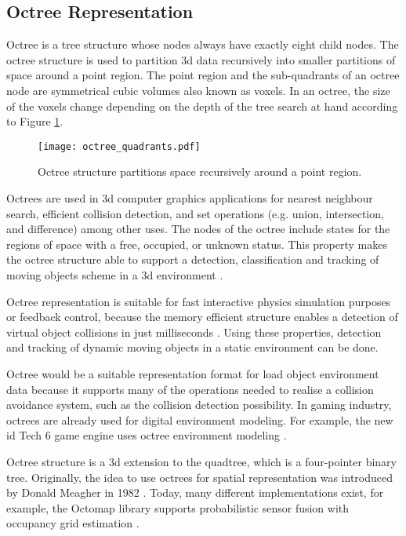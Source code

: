 \documentclass[12pt,a4paper,oneside,pdftex]{report}
\begin{document}
\subsection{Octree Representation}
\label{subsection:octree_representation}

Octree is a tree structure whose nodes always have exactly eight child nodes. The octree structure is used to partition 3d data recursively into smaller partitions of space around a point region\citep{Laine11}. The point region and the sub-quadrants of an octree node are symmetrical cubic volumes also known as voxels. In an octree, the size of the voxels change depending on the depth of the tree search at hand according to Figure \ref{fig:octree_quadrants}.

\begin{figure}[ht]
  \begin{center}
    \texttt{[image: octree\_quadrants.pdf]}
    \caption{Octree structure partitions space recursively around a point region.}
    \label{fig:octree_quadrants}
  \end{center}
\end{figure}

Octrees are used in 3d computer graphics applications for nearest neighbour search, efficient collision detection, and set operations (e.g. union, intersection, and difference) among other uses. The nodes of the octree include states for the regions of space with a free, occupied, or unknown status. This property makes the octree structure able to support a detection, classification and tracking of moving objects scheme in a 3d environment \citep{Azim12, Ouyang12}.

Octree representation is suitable for fast interactive physics simulation purposes or feedback control, because the memory efficient structure enables a detection of virtual object collisions in just milliseconds \citep{Noborio99}. Using these properties, detection and tracking of dynamic moving objects in a static environment can be done.

Octree would be a suitable representation format for load object environment data because it supports many of the operations needed to realise a collision avoidance system, such as the collision detection possibility. In gaming industry, octrees are already used for digital environment modeling. For example, the new id Tech 6 game engine uses octree environment modeling \citep{Shrout08}.

Octree structure is a 3d extension to the quadtree, which is a four-pointer binary tree. Originally, the idea to use octrees for spatial representation was introduced by Donald Meagher in 1982 \citep{Meagher82}. Today, many different implementations exist, for example, the Octomap library supports probabilistic sensor fusion with occupancy grid estimation \citep{Hornung10}. 
\end{document}
